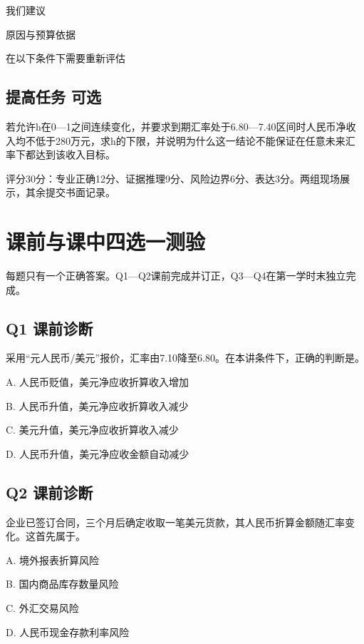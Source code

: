 \documentclass[lang=cn,11pt,oneside,openany,chinesefont=nofont,color=blue,titlestyle=hang]{elegantbook}
\begin{document}
我们建议\hrulefill{}\par\noindent 原因与预算依据\hrulefill{}\par\noindent 在以下条件下需要重新评估\hrulefill{}

\subsection*{提高任务  可选}

若允许h在0—1之间连续变化，并要求到期汇率处于6.80—7.40区间时人民币净收入均不低于280万元，求h的下限，并说明为什么这一结论不能保证在任意未来汇率下都达到该收入目标。\par\noindent \hrulefill{}\par\noindent \hrulefill{}

评分30分：专业正确12分、证据推理9分、风险边界6分、表达3分。两组现场展示，其余提交书面记录。

\clearpage

\section{课前与课中四选一测验}\label{sec:g16}

\begingroup\small{}\setlength{\parskip}{3pt}
每题只有一个正确答案。Q1—Q2课前完成并订正，Q3—Q4在第一学时末独立完成。

\subsection*{Q1  课前诊断}

采用“元人民币/美元”报价，汇率由7.10降至6.80。在本讲条件下，正确的判断是。

A. 人民币贬值，美元净应收折算收入增加

B. 人民币升值，美元净应收折算收入减少

C. 美元升值，美元净应收折算收入减少

D. 人民币升值，美元净应收金额自动减少

\subsection*{Q2  课前诊断}

企业已签订合同，三个月后确定收取一笔美元货款，其人民币折算金额随汇率变化。这首先属于。

A. 境外报表折算风险

B. 国内商品库存数量风险

C. 外汇交易风险

D. 人民币现金存款利率风险
\end{document}
